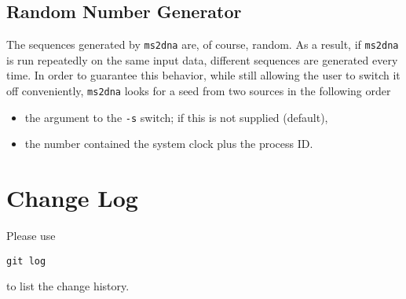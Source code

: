 \documentclass[a4paper, english]{article}
\begin{document}
\subsection*{Random Number Generator}
The sequences generated by \texttt{ms2dna} are, of course, random. As a result, if
\texttt{ms2dna} is run repeatedly on the same input data, different sequences are
generated every time. In order to guarantee this behavior, while still
allowing the user to switch it off conveniently, \texttt{ms2dna}
looks for a seed from two sources in the following order
\begin{itemize}
\item the argument to the \texttt{-s} switch; if this is not supplied (default),
\item the number contained the system clock plus the process ID.
\end{itemize}

\section{Change Log}
Please use
\begin{verbatim}
git log
\end{verbatim}
to list the change history.


\end{document}
